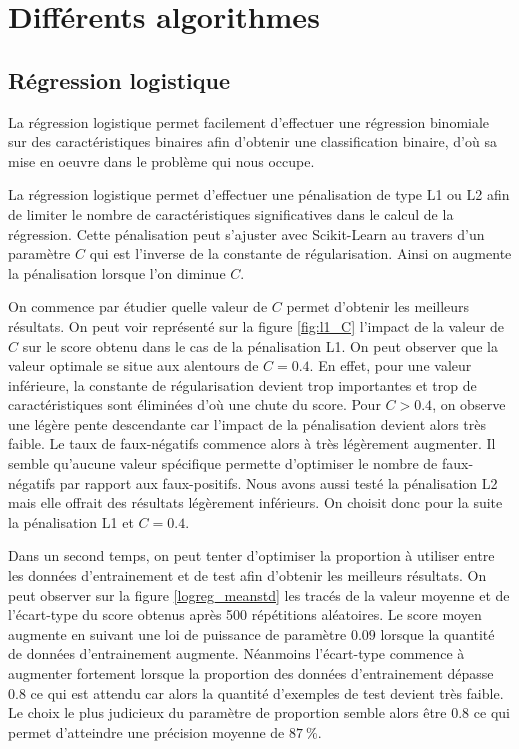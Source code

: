 \documentclass[11pt,a4paper]{article}
\begin{document}
\section{Différents algorithmes}
	\subsection{Régression logistique}
		La régression logistique permet facilement d'effectuer une régression binomiale sur des caractéristiques binaires afin d'obtenir une classification binaire, d'où sa mise en oeuvre dans le problème qui nous occupe.

		La régression logistique permet d'effectuer une pénalisation de type L1 ou L2 afin de limiter le nombre de caractéristiques significatives dans le calcul de la régression. Cette pénalisation peut s'ajuster avec Scikit-Learn au travers d'un paramètre $C$ qui est l'inverse de la constante de régularisation. Ainsi on augmente la pénalisation lorsque l'on diminue $C$.

		On commence par étudier quelle valeur de $C$ permet d'obtenir les meilleurs résultats. On peut voir représenté sur la figure \ref{fig:l1_C} l'impact de la valeur de $C$ sur le score obtenu dans le cas de la pénalisation L1. On peut observer que la valeur optimale se situe aux alentours de $C=0.4$. En effet, pour une valeur inférieure, la constante de régularisation devient trop importantes et trop de caractéristiques sont éliminées d'où une chute du score. Pour $C>0.4$, on observe une légère pente descendante car l'impact de la pénalisation devient alors très faible. Le taux de faux-négatifs commence alors à très légèrement augmenter. Il semble qu'aucune valeur spécifique permette d'optimiser le nombre de faux-négatifs par rapport aux faux-positifs. Nous avons aussi testé la pénalisation L2 mais elle offrait des résultats légèrement inférieurs. On choisit donc pour la suite la pénalisation L1 et $C=0.4$.

		Dans un second temps, on peut tenter d'optimiser la proportion à utiliser entre les données d'entrainement et de test afin d'obtenir les meilleurs résultats. On peut observer sur la figure \ref{logreg_meanstd} les tracés de la valeur moyenne et de l'écart-type du score obtenus après 500 répétitions aléatoires. Le score moyen augmente en suivant une loi de puissance de paramètre $0.09$ lorsque la quantité de données d'entrainement augmente. Néanmoins l'écart-type commence à augmenter fortement lorsque la proportion des données d'entrainement dépasse $0.8$ ce qui est attendu car alors la quantité d'exemples de test devient très faible. Le choix le plus judicieux du paramètre de proportion semble alors être $0.8$ ce qui permet d'atteindre une précision moyenne de $\SI{87}{\percent}$.
\end{document}
